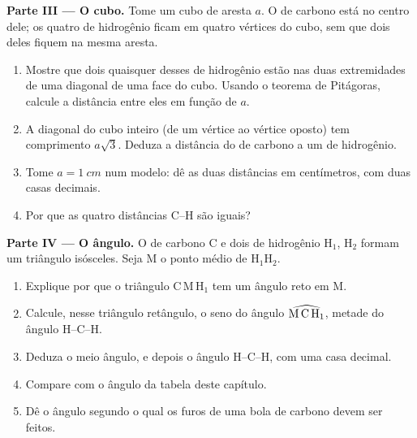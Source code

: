 \begin{problem}
\medskip
\noindent\textbf{Parte III --- O cubo.}
Tome um cubo de aresta $a$. O  de carbono está no centro dele; os
quatro  de hidrogênio ficam em quatro vértices do cubo, sem que
dois deles fiquem na mesma aresta.
\begin{enumerate}[resume]
  \item Mostre que dois quaisquer desses  de hidrogênio estão nas
        duas extremidades de uma diagonal de uma face do cubo. Usando o
        teorema de Pitágoras, calcule a distância entre eles em função
        de $a$.
  \item A diagonal do cubo inteiro (de um vértice ao vértice oposto) tem
        comprimento $a\sqrt{3}$. Deduza a distância do  de carbono a
        um  de hidrogênio.
  \item Tome $a = \qty{1}{cm}$ num modelo: dê as duas distâncias em
        centímetros, com duas casas decimais.
  \item Por que as quatro distâncias C--H são iguais?
\end{enumerate}

\medskip
\noindent\textbf{Parte IV --- O ângulo.}
O  de carbono C e dois  de hidrogênio H$_1$, H$_2$ formam um
triângulo isósceles. Seja M o ponto médio de H$_1$H$_2$.
\begin{enumerate}[resume]
  \item Explique por que o triângulo C\,M\,H$_1$ tem um ângulo reto em M.
  \item Calcule, nesse triângulo retângulo, o seno do ângulo
        $\widehat{\text{M\,C\,H}_1}$, metade do ângulo H--C--H.
  \item Deduza o meio ângulo, e depois o ângulo H--C--H, com uma casa
        decimal.
  \item Compare com o ângulo da tabela deste capítulo.
  \item Dê o ângulo segundo o qual os furos de uma bola de carbono devem
        ser feitos.
\end{enumerate}
\end{problem}
